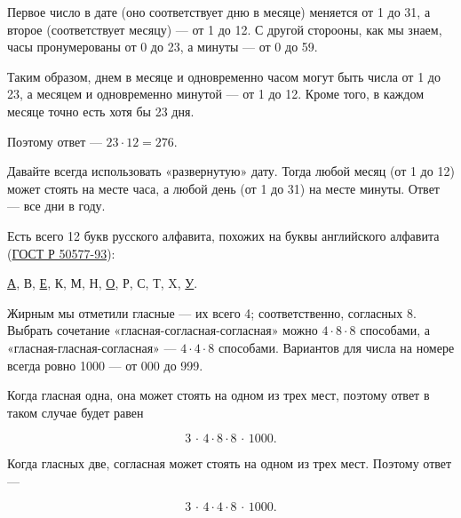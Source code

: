 ﻿
\begin{itemize}
\itA Первое число в дате (оно соответствует дню в месяце) меняется от 1 до 31, а второе (соответствует месяцу) — от 1 до 12. С другой сторооны, как мы знаем, часы пронумерованы от 0 до 23, а минуты — от 0 до 59.

\ms Таким образом, днем в месяце и одновременно часом могут быть числа от 1 до 23, а месяцем и одновременно минутой — от 1 до 12. Кроме того, в каждом месяце точно есть хотя бы 23 дня.

\ms Поэтому ответ — $23 \cdot 12 = 276$.

\itB Давайте всегда использовать «развернутую» дату. Тогда любой месяц (от 1 до 12) может стоять на месте часа, а любой день (от 1 до 31) на месте минуты. Ответ — все дни в году.

\itC Есть всего 12 букв русского алфавита, похожих на буквы английского алфавита (\href{http://base.garant.ru/12142212}{ГОСТ Р 50577-93}): \medskip

\centerline{{\underline А}, В, {\underline Е}, К, М, Н, {\underline О}, Р, С, Т, X, {\underline У}.}

\ms Жирным мы отметили гласные — их всего 4; соответственно, согласных 8. Выбрать сочетание «гласная-согласная-согласная» можно $4 \cdot 8 \cdot 8$ способами, а «гласная-гласная-согласная» — $4 \cdot 4 \cdot 8$ способами. Вариантов для числа на номере всегда ровно 1000 — от 000 до 999.

\ms Когда гласная одна, она может стоять на одном из трех мест, поэтому ответ в таком случае будет равен

$$3\,\cdot\,4\cdot8\cdot8\,\cdot\,1000.$$

\ms Когда гласных две, согласная может стоять на одном из трех мест. Поэтому ответ —

$$3\,\cdot\,4\cdot4\cdot8\,\cdot\,1000.$$
\end{itemize}